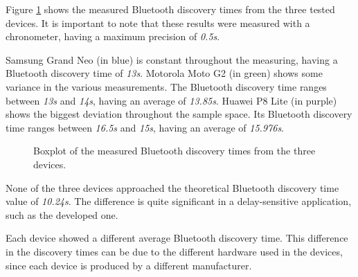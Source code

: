 Figure \ref{fig:normaldisc} shows the measured Bluetooth discovery times from the three tested devices. It is important to note that these results were measured with a chronometer, having a maximum precision of \textit{0.5s}.

Samsung Grand Neo (in blue) is constant throughout the measuring, having a Bluetooth discovery time of \textit{13s}. Motorola Moto G2 (in green) shows some variance in the various measurements. The Bluetooth discovery time ranges between \textit{13s} and \textit{14s}, having an average of \textit{13.85s}. Huawei P8 Lite (in purple) shows the biggest deviation throughout the sample space. Its Bluetooth discovery time ranges between \textit{16.5s} and \textit{15s}, having an average of \textit{15.976s}.

\begin{figure}[ht]
	\noindent{}
	\caption{\label{fig:normaldisc} Boxplot of the measured Bluetooth discovery times from the three devices.}
\end{figure}

None of the three devices approached the theoretical Bluetooth discovery time value of \textit{10.24s}. The difference is quite significant in a delay-sensitive application, such as the developed one.

Each device showed a different average Bluetooth discovery time. This difference in the discovery times can be due to the different hardware used in the devices, since each device is produced by a different manufacturer.

